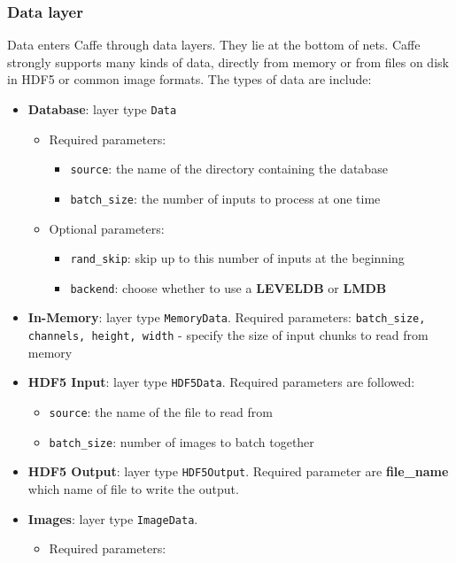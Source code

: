 \subsubsection{Data layer}
Data enters Caffe through data layers. They lie at the bottom of nets. Caffe strongly supports many kinds of data, directly from memory or from files on disk in HDF5 or common image formats. The types of data are include:
\begin{itemize}
	\item \textbf{Database}: layer type \texttt{Data}
		\begin{itemize}
			\item Required parameters:
				\begin{itemize}
					\item \texttt{source}: the name of the directory containing the database
					\item \texttt{batch\_size}: the number of inputs to process at one time
				\end{itemize}
			\item Optional parameters:
				\begin{itemize}
					\item \texttt{rand\_skip}: skip up to this number of inputs at the beginning
					\item \texttt{backend}: choose whether to use a \textbf{LEVELDB} or \textbf{LMDB}
				\end{itemize}
		\end{itemize}
	\item \textbf{In-Memory}: layer type \texttt{MemoryData}. Required parameters: \texttt{batch\_size, channels, height, width} - specify the size of input chunks to read from memory
	\item \textbf{HDF5 Input}: layer type \texttt{HDF5Data}. Required parameters are followed:
		\begin{itemize}
			\item \texttt{source}: the name of the file to read from
			\item \texttt{batch\_size}: number of images to batch together
		\end{itemize}
	\item \textbf{HDF5 Output}: layer type \texttt{HDF5Output}. Required parameter are \textbf{file\_name} which name of file to write the output.
	\item \textbf{Images}: layer type \texttt{ImageData}.
		\begin{itemize}
			\item Required parameters:

\end{itemize}
\end{itemize}
